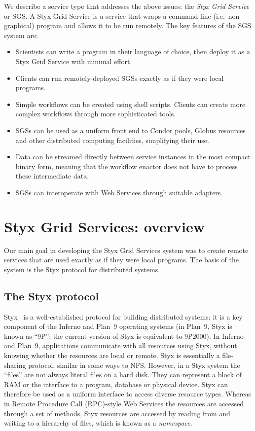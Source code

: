 \documentclass[a4paper]{article}
\begin{document}
We describe a service type that addresses the above issues: the \textit{Styx Grid Service} or SGS.  A Styx Grid Service is a service that wraps a command-line (i.e.\ non-graphical) program and allows it to be run remotely.  The key features of the SGS system are:

\begin{itemize}
\item Scientists can write a program in their language of choice, then deploy it as a Styx Grid Service with minimal effort.
\item Clients can run remotely-deployed SGSs exactly as if they were local programs.
\item Simple workflows can be created using shell scripts.  Clients can create more complex workflows through more sophisticated tools.
\item SGSs can be used as a uniform front end to Condor pools, Globus resources and other distributed computing facilities, simplifying their use.
\item Data can be streamed directly between service instances in the most compact binary form, meaning that the workflow enactor does not have to process these intermediate data.
\item SGSs can interoperate with Web Services through suitable adapters.
\end{itemize}

\section{Styx Grid Services: overview}\label{sec:sgsoverview}
Our main goal in developing the Styx Grid Services system was to create remote services that are used exactly as if they were local programs.  The basis of the system is the Styx protocol for distributed systems.  

\subsection{The Styx protocol}
Styx~\cite{Pike:1999} is a well-established protocol for building distributed systems: it is a key component of the Inferno \cite{Inferno} and Plan~9 \cite{Plan9} operating systems (in Plan~9, Styx is known as ``9P'': the current version of Styx is equivalent to 9P2000).  In Inferno and Plan~9, applications communicate with all resources using Styx, without knowing whether the resources are local or remote.  Styx is essentially a file-sharing protocol, similar in some ways to NFS.  However, in a Styx system the ``files'' are not always literal files on a hard disk.  They can represent a block of RAM or the interface to a program, database or physical device.  Styx can therefore be used as a uniform interface to access diverse resource types.  Whereas in Remote Procedure Call (RPC)-style Web Services the resources are accessed through a set of methods, Styx resources are accessed by reading from and writing to a hierarchy of files, which is known as a \textit{namespace\/}.
\end{document}
